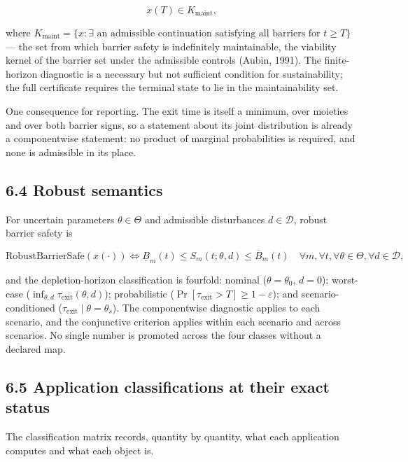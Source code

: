 \documentclass[11pt]{article}
\begin{document}
$$x(T) \in K_{\mathrm{maint}},$$

 where \(K_{\mathrm{maint}} =\allowbreak{} \{ x : \exists \text{ an admissible continuation satisfying all barriers for } t \ge T \}\) --- the set from which barrier safety is indefinitely maintainable, the viability kernel of the barrier set under the admissible controls (Aubin, 1991). The finite-horizon diagnostic is a necessary but not sufficient condition for sustainability; the full certificate requires the terminal state to lie in the maintainability set.

One consequence for reporting. The exit time is itself a minimum, over moieties and over both barrier signs, so a statement about its joint distribution is already a componentwise statement: no product of marginal probabilities is required, and none is admissible in its place.

\subsection*{6.4 Robust semantics}\label{64-robust-semantics}

For uncertain parameters \(\theta \in \Theta\) and admissible disturbances \(d \in \mathcal{D}\), robust barrier safety is 

$$\mathrm{RobustBarrierSafe}(x(\cdot)) \iff \underline{B}_m(t) \le S_m(t; \theta, d) \le \overline{B}_m(t) \quad \forall m, \forall t, \forall \theta \in \Theta, \forall d \in \mathcal{D},$$

 and the depletion-horizon classification is fourfold: nominal (\(\theta = \theta_0\), \(d = 0\)); worst-case (\(\inf_{\theta,\allowbreak{}d} \tau_{\mathrm{exit}}(\theta,\allowbreak{}d)\)); probabilistic (\(\Pr[\tau_{\mathrm{exit}} > T] \ge 1 - \varepsilon\)); and scenario-conditioned (\(\tau_{\mathrm{exit}} \mid \theta =\allowbreak{} \theta_s\)). The componentwise diagnostic applies to each scenario, and the conjunctive criterion applies within each scenario and across scenarios. No single number is promoted across the four classes without a declared map.

\subsection*{6.5 Application classifications at their exact status}\label{65-application-classifications-at-their-exact-status}

The classification matrix records, quantity by quantity, what each application computes and what each object is.
\end{document}
